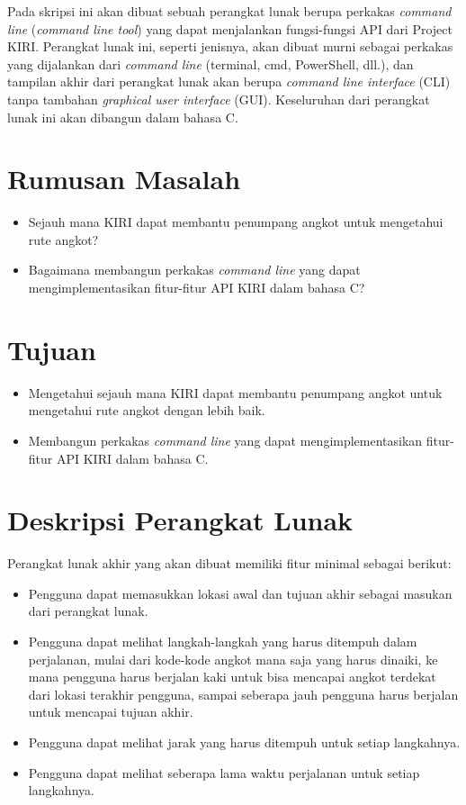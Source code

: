 \documentclass[a4paper,twoside]{article}
\begin{document}
Pada skripsi ini akan dibuat sebuah perangkat lunak berupa perkakas \textit{command line} (\textit{command line tool}) yang dapat menjalankan fungsi-fungsi API dari Project KIRI. Perangkat lunak ini, seperti jenisnya, akan dibuat murni sebagai perkakas yang dijalankan dari \textit{command line} (terminal, cmd, PowerShell, dll.), dan tampilan akhir dari perangkat lunak akan berupa \textit{command line interface} (CLI) tanpa tambahan \textit{graphical user interface} (GUI). Keseluruhan dari perangkat lunak ini akan dibangun dalam bahasa C.

\section{Rumusan Masalah}
\begin{itemize}
	\item Sejauh mana KIRI dapat membantu penumpang angkot untuk mengetahui rute angkot?
	\item Bagaimana membangun perkakas \textit{command line} yang dapat mengimplementasikan fitur-fitur API KIRI dalam bahasa C?
\end{itemize}

\section{Tujuan}
\begin{itemize}
	\item Mengetahui sejauh mana KIRI dapat membantu penumpang angkot untuk mengetahui rute angkot dengan lebih baik.
	\item Membangun perkakas \textit{command line} yang dapat mengimplementasikan fitur-fitur API KIRI dalam bahasa C.
\end{itemize}

\section{Deskripsi Perangkat Lunak}
Perangkat lunak akhir yang akan dibuat memiliki fitur minimal sebagai berikut:
\begin{itemize}
	\item Pengguna dapat memasukkan lokasi awal dan tujuan akhir sebagai masukan dari perangkat lunak.
	\item Pengguna dapat melihat langkah-langkah yang harus ditempuh dalam perjalanan, mulai dari kode-kode angkot mana saja yang harus dinaiki, ke mana pengguna harus berjalan kaki untuk bisa mencapai angkot terdekat dari lokasi terakhir pengguna, sampai seberapa jauh pengguna harus berjalan untuk mencapai tujuan akhir.
	\item Pengguna dapat melihat jarak yang harus ditempuh untuk setiap langkahnya.
	\item Pengguna dapat melihat seberapa lama waktu perjalanan untuk setiap langkahnya.
		
\end{itemize}
\end{document}
